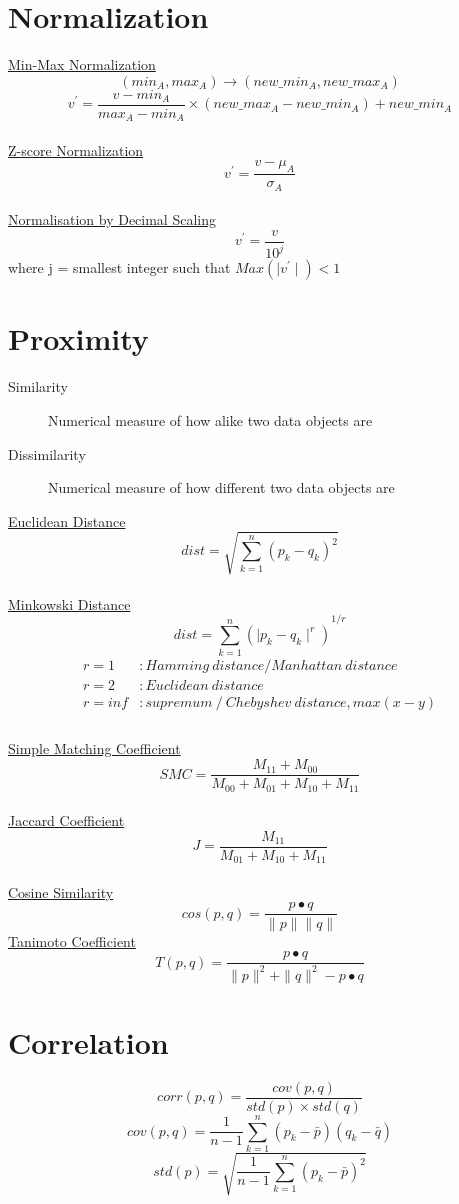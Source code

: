\section{Normalization}

\underline{Min-Max Normalization}
$$(min_A, max_A) \rightarrow (new\_min_A, new\_max_A)$$
$${v^{'}={\frac{v-min_A}{max_A-min_A}} \times (new\_max_A-new\_min_A) + new\_min_A}$$
\\
\underline{Z-score Normalization}
$$v^{'}=\frac{v-\mu_A}{\sigma_A}$$
\\
\underline{Normalisation by Decimal Scaling}
$$v^{'}=\frac{v}{10^{j}}$$
where j = smallest integer such that $Max(\mid v^{'}\mid) < 1$

\section{Proximity}

\begin{description}
\item[Similarity] Numerical measure of how alike two data objects are
\item[Dissimilarity] Numerical measure of how different two data objects are
\end{description}
\underline{Euclidean Distance}
$$dist=\sqrt{\sum_{k=1}^{n}{(p_k-q_k)^2}}$$
\\
\underline{Minkowski Distance}
$$dist={\sum_{k=1}^{n}{(\mid p_k-q_k\mid^r)}}^{1/r}$$
\begin{align*}
r = 1&: Hamming\ distance / Manhattan\ distance\\
r = 2&: Euclidean\ distance \\
r = inf&: supremum\ /\ Chebyshev\ distance, max(x - y) \\
\end{align*}
\\
\underline{Simple Matching Coefficient}
$$SMC=\frac{M_{11} + M_{00}}{M_{00} + M_{01} + M_{10} + M_{11}}$$
\\
\underline{Jaccard Coefficient}
$$J=\frac{M_{11}}{M_{01} + M_{10} + M_{11}}$$
\\
\underline{Cosine Similarity}
$$cos(p,q)=\frac{p\bullet q}{\|p\|\|q\|}$$
\underline{Tanimoto Coefficient}
$$T(p,q)=\frac{p\bullet q}{\|p\|^{2}+\|q\|^{2}-p\bullet q}$$

\section{Correlation}

$$corr(p,q)=\frac{cov(p,q)}{std(p) \times std(q)}$$
$$cov(p,q)=\frac{1}{n-1}\sum_{k=1}^{n}{(p_k-\bar{p})(q_k-\bar{q})}$$
$$std(p)=\sqrt{\frac{1}{n-1}\sum_{k=1}^{n}{(p_k-\bar{p})^{2}}}$$
